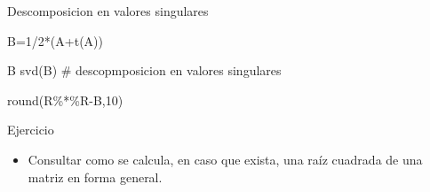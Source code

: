 \documentclass[
  ignorenonframetext,
  aspectratio=169,
  spanish,
]{beamer}
\newenvironment{Shaded}{\begin{snugshade}}{\end{snugshade}}
\newcommand{\CommentTok}[1]{\textcolor[rgb]{0.37,0.37,0.37}{#1}}
\newcommand{\DecValTok}[1]{\textcolor[rgb]{0.68,0.00,0.00}{#1}}
\newcommand{\FunctionTok}[1]{\textcolor[rgb]{0.28,0.35,0.67}{#1}}
\newcommand{\NormalTok}[1]{\textcolor[rgb]{0.00,0.23,0.31}{#1}}
\newcommand{\OtherTok}[1]{\textcolor[rgb]{0.00,0.23,0.31}{#1}}
\newcommand{\SpecialCharTok}[1]{\textcolor[rgb]{0.37,0.37,0.37}{#1}}
\providecommand{\tightlist}{%
  \setlength{\itemsep}{0pt}\setlength{\parskip}{0pt}}
\begin{document}
\begin{frame}[fragile]{Descomposicion en valores singulares}
\label{descomposicion-en-valores-singulares}
\begin{Shaded}
\begin{Highlighting}[]
\NormalTok{B}\OtherTok{=}\DecValTok{1}\SpecialCharTok{/}\DecValTok{2}\SpecialCharTok{*}\NormalTok{(A}\SpecialCharTok{+}\FunctionTok{t}\NormalTok{(A)) }
\end{Highlighting}
\end{Shaded}

\begin{Shaded}
\begin{Highlighting}[]
\NormalTok{B}
\FunctionTok{svd}\NormalTok{(B) }\CommentTok{\# descopmposicion en valores singulares  }
\end{Highlighting}
\end{Shaded}

\begin{Shaded}
\end{Shaded}

\begin{Shaded}
\end{Shaded}

\begin{Shaded}
\begin{Highlighting}[]
\FunctionTok{round}\NormalTok{(R}\SpecialCharTok{\%*\%}\NormalTok{R}\SpecialCharTok{{-}}\NormalTok{B,}\DecValTok{10}\NormalTok{)}
\end{Highlighting}
\end{Shaded}
\end{frame}

\begin{frame}{Ejercicio}
\label{ejercicio-5}
\begin{itemize}
\tightlist
\item
  Consultar como se calcula, en caso que exista, una raíz cuadrada de
  una matriz en forma general.
\end{itemize}
\end{frame}
\end{document}

